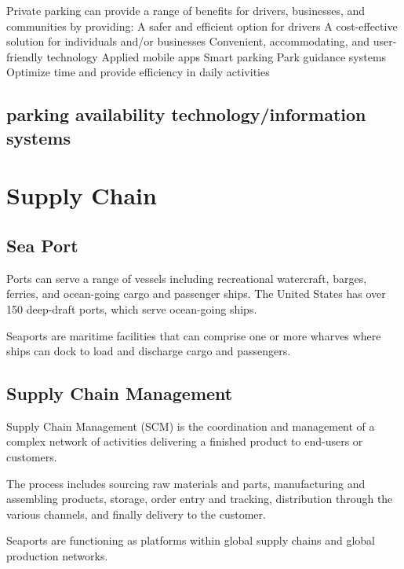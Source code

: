 \documentclass[
]{book}
\begin{document}
Private parking can provide a range of benefits for drivers, businesses, and communities by providing:
A safer and efficient option for drivers
A cost-effective solution for individuals and/or businesses
Convenient, accommodating, and user-friendly technology
Applied mobile apps
Smart parking
Park guidance systems
Optimize time and provide efficiency in daily activities

\hypertarget{parking-availability-technologyinformation-systems}{%
\section{parking availability technology/information systems}\label{parking-availability-technologyinformation-systems}}

\hypertarget{SupplyChain}{%
\chapter{Supply Chain}\label{SupplyChain}}

\hypertarget{SupplyChain-Seaport}{%
\section{Sea Port}\label{SupplyChain-Seaport}}

Ports can serve a range of vessels including recreational watercraft, barges, ferries, and ocean-going cargo and passenger ships. The United States has over 150 deep-draft ports, which serve ocean-going ships.

Seaports are maritime facilities that can comprise one or more wharves where ships can dock to load and discharge cargo and passengers.

\hypertarget{SupplyChain-Seaportmng}{%
\section{Supply Chain Management}\label{SupplyChain-Seaportmng}}

Supply Chain Management (SCM) is the coordination and management of a complex network of activities delivering a finished product to end-users or customers.

The process includes sourcing raw materials and parts, manufacturing and assembling products, storage, order entry and tracking, distribution through the various channels, and finally delivery to the customer.

Seaports are functioning as platforms within global supply chains and global production networks.
\end{document}
